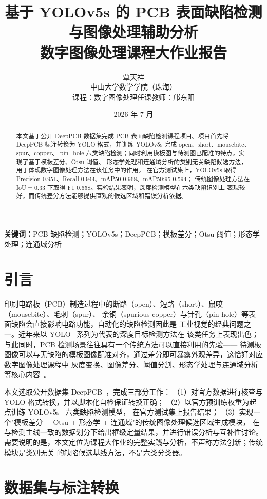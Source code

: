 \documentclass[UTF8,a4paper,zihao=5,twocolumn,fontset=fandol]{ctexart}
\title{\bfseries 基于 YOLOv5s 的 PCB 表面缺陷检测与图像处理辅助分析\\
\large 数字图像处理课程大作业报告}
\author{覃天祥\quad 23339096\\
\small 中山大学数学学院（珠海）\\
\small 课程：数字图像处理\quad 任课教师：邝东阳}
\date{2026 年 7 月}
\begin{document}
\maketitle

\begin{abstract}
本文基于公开 DeepPCB 数据集完成 PCB 表面缺陷检测课程项目。项目首先将
DeepPCB 标注转换为 YOLO 格式，并训练 YOLOv5s 完成 open、short、mousebite、spur、copper、
pin\_hole 六类缺陷检测；同时利用模板图与待测图已配准的特点，实现了基于模板差分、Otsu 阈值、
形态学处理和连通域分析的类别无关缺陷候选方法，用于体现数字图像处理方法在该任务中的作用。
在官方测试集上，YOLOv5s 取得 Precision 0.951、Recall 0.944、mAP50 0.968、mAP50:95 0.594；
传统图像处理方法在 IoU$=$0.33 下取得 F1 0.658。实验结果表明，深度检测模型在六类缺陷识别上
表现较好，而传统差分方法能够提供直观的候选区域和错误分析依据。
\end{abstract}

\noindent\textbf{关键词：}PCB 缺陷检测；YOLOv5s；DeepPCB；模板差分；Otsu 阈值；形态学处理；连通域分析

\section{引言}

印刷电路板（PCB）制造过程中的断路（open）、短路（short）、鼠咬（mousebite）、毛刺（spur）、
余铜（spurious copper）与针孔（pin-hole）等表面缺陷会直接影响电路功能，自动化的缺陷检测因此是
工业视觉的经典问题之一。近年来以 YOLO~\cite{redmon2016yolo} 系列为代表的深度目标检测方法在
该类任务上表现出色；与此同时，PCB 检测场景往往具有一个传统方法可以直接利用的先验——
待测板图像可以与无缺陷的模板图像配准对齐，通过差分即可暴露外观差异，这恰好对应数字图像处理课程中
灰度变换、图像差分、阈值分割、形态学处理与连通域分析等核心内容~\cite{gonzalez2018dip}。

本文选取公开数据集 DeepPCB~\cite{tang2019deeppcb}，完成三部分工作：
（1）对官方数据进行核查与 YOLO 格式转换，并以脚本化自检保证转换正确；
（2）以官方预训练权重为起点训练 YOLOv5s~\cite{jocher2020yolov5} 六类缺陷检测模型，
在官方测试集上报告结果；
（3）实现一个"模板差分 + Otsu + 形态学 + 连通域"的传统图像处理候选区域生成模块，
在与检测主线一致的数据划分下给出框级定量结果，并进行错误分析与互补性讨论。
需要说明的是，本文定位为课程大作业的完整实践与分析，不声称方法创新；传统模块是类别无关
的缺陷候选基线方法，不是六类分类器。

\section{数据集与标注转换}
\end{document}
